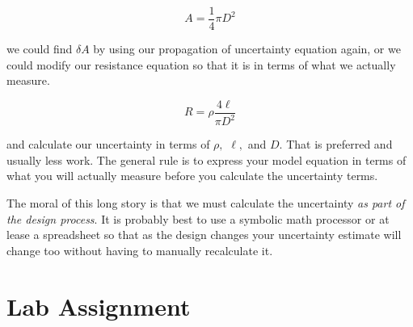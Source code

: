 \begin{equation*}
	A=\frac{1}{4}\pi D^{2}
\end{equation*}

we could find $\delta A$ by using our propagation of uncertainty equation again, or we could modify our resistance equation so that it is in terms of what we actually measure.

\begin{equation*}
	R=\rho \frac{4\ell }{\pi D^{2}}
\end{equation*}

and calculate our uncertainty in terms of $\rho ,$ $\ell ,$ and $D.$ That is preferred and usually less work. The general rule is to express your model equation in terms of what you will actually measure before you calculate the uncertainty terms.

The moral of this long story is that we must calculate the uncertainty \emph{as part of the design process}. It is probably best to use a symbolic math processor or at lease a spreadsheet so that as the design changes your uncertainty estimate will change too without having to manually recalculate it.


\vspace*{\fill}

\pagebreak

\section{Lab Assignment}

